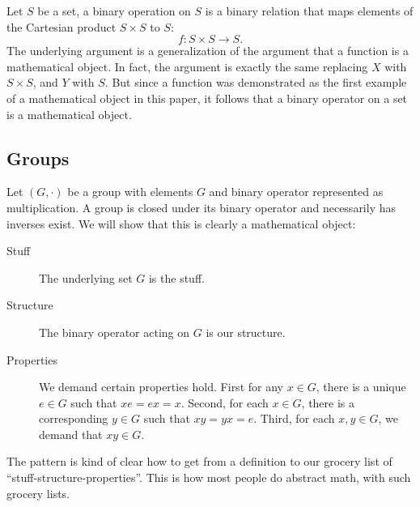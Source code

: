 Let $S$ be a set, a binary operation on $S$ is a binary relation
that maps elements of the Cartesian product $S\times S$ to $S$:
\begin{equation}%
f:S\times S\to S.
\end{equation}
The underlying argument is a generalization of the argument that
a function is a mathematical object. In fact, the argument is
exactly the same replacing $X$ with $S\times S$, and $Y$ with
$S$. But since a function was demonstrated as the first example
of a mathematical object in this paper, it follows that a binary
operator on a set is a mathematical object.

\subsection{Groups}

Let $(G,\cdot)$ be a group with elements $G$ and binary operator
represented as multiplication. A group is closed under its binary
operator and necessarily has inverses exist. We will show that
this is clearly a mathematical object:

\begin{description}
\item[Stuff] The underlying set $G$ is the stuff.
\item[Structure] The binary operator acting on $G$ is our
  structure.
\item[Properties] We demand certain properties hold. First for
  any $x\in G$, there is a unique $e\in G$ such that
  $xe=ex=x$. Second, for each $x\in G$, there is a corresponding
  $y\in G$ such that $xy=yx=e$. Third, for each $x,y\in G$, we
  demand that $xy\in G$.
\end{description}
\noindent The pattern is kind of clear how to get from a
definition to our grocery list of ``stuff-structure-properties''.
This is how most people do abstract math, with such grocery
lists.

